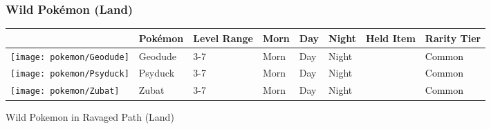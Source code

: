 \subsubsection{Wild Pokémon (Land)}%
\label{ssubsec:WildPokmon(Land)}%
\begin{longtable}{||l l l l l l l l||}%
\hline%
&Pokémon&Level Range&Morn&Day&Night&Held Item&Rarity Tier\\%
\hline%
\endhead%
\hline%
\texttt{[image: pokemon/Geodude]}&Geodude&3{-}7&Morn&Day&Night&&\textcolor{black}{%
Common%
}\\%
\hline%
\texttt{[image: pokemon/Psyduck]}&Psyduck&3{-}7&Morn&Day&Night&&\textcolor{black}{%
Common%
}\\%
\hline%
\texttt{[image: pokemon/Zubat]}&Zubat&3{-}7&Morn&Day&Night&&\textcolor{black}{%
Common%
}\\%
\hline%
\end{longtable}%
\caption{Wild Pokemon in Ravaged Path (Land)}